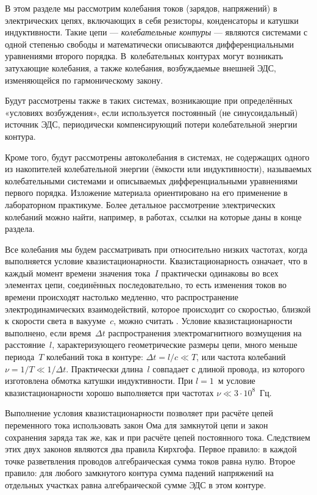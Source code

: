 В этом разделе мы рассмотрим колебания токов (зарядов, напряжений) 
в электрических цепях, включающих в себя резисторы, конденсаторы и катушки 
индуктивности. Такие цепи --- \emph{колебательные контуры} --- являются системами 
с одной степенью свободы и математически описываются дифференциальными 
уравнениями второго порядка. В~колебательных контурах могут возникать 
 затухающие колебания, а также  
колебания, возбуждаемые внешней ЭДС, изменяющейся по гармоническому закону.

Будут рассмотрены также  в таких системах, 
возникающие при определённых «условиях возбуждения», если используется 
постоянный (не синусоидальный) источник ЭДС, периодически компенсирующий 
потери колебательной энергии контура.

Кроме того, будут рассмотрены автоколебания в системах, не содержащих 
одного из накопителей колебательной энергии (ёмкости или индуктивности), 
называемых  колебательными системами и описываемых 
дифференциальными уравнениями первого порядка.
Изложение материала ориентировано на его применение в лабораторном практикуме. 
Более детальное рассмотрение электрических колебаний можно найти, например, 
в работах, ссылки на которые даны в конце раздела.

Все колебания мы будем рассматривать при относительно низких частотах, когда
выполняется условие квазистационарности. Квазистационарность означает, что в
каждый момент времени значения тока~$I$ практически одинаковы во всех элементах
цепи, соединённых последовательно, то есть изменения токов во времени происходят
настолько медленно, что распространение электродинамических взаимодействий,
которое происходит со скоростью, близкой к скорости света в вакууме~$c$, можно
считать . Условие квазистационарности выполнено, если
время~$\Delta t$ распространения электромагнитного возмущения на расстояние~$l$,
характеризующего геометрические размеры цепи, много меньше периода~$T$ колебаний
тока в контуре: $\Delta t=l/c\ll T$, или частота колебаний $\nu=1/T\ll1/\Delta
t$. Практически длина~$l$ совпадает с длиной провода, из которого изготовлена
обмотка катушки индуктивности. При $l=1$~м условие квазистационарности хорошо
выполняется при частотах $\nu\ll3\cdot10^8$~Гц.

Выполнение условия квазистационарности позволяет при расчёте цепей переменного
тока использовать закон Ома для замкнутой цепи и закон сохранения заряда так же,
как и при расчёте цепей постоянного тока. Следствием этих двух законов являются
два правила Кирхгофа. Первое правило: в каждой точке разветвления проводов
алгебраическая сумма токов равна нулю. Второе правило: для любого замкнутого
контура сумма падений напряжений на отдельных участках равна алгебраической
сумме ЭДС в этом контуре.

